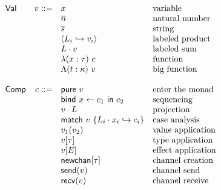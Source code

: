 \documentclass[12pt]{article}
\begin{document}
\[\begin{array}{l r l l}
\\
\textsf{Val}  &      v ::= & x                                 & \text{variable} \\
              &            & \overline{n}                      & \text{natural number} \\
              &            & \overline{s}                      & \text{string} \\
              &            & \langle
                             L_i \hookrightarrow v_i
                             \rangle                           & \text{labeled product} \\
              &            & L \cdot v                         & \text{labeled sum} \\
              &            & \lambda (x : \tau) \ c            & \text{function} \\
              &            & \Lambda (t : \kappa) \ v          & \text{big function} \\
\\
\textsf{Comp} &      c ::= & \textsf{pure} \ v                 & \text{enter the monad} \\
              &            & \textsf{bind} \ x \leftarrow c_1
                             \ \textsf{in} \ c_2               & \text{sequencing} \\
              &            & v \cdot L                         & \text{projection} \\
              &            & \textsf{match} \ v \ \{
                             L_i \cdot x_i \hookrightarrow c_i
                             \}                                & \text{case analysis} \\
              &            & v_1(v_2)                          & \text{value application} \\
              &            & v[\tau]                           & \text{type application} \\
              &            & v[E]                              & \text{effect application} \\
              &            & \textsf{newchan}[\tau]            & \text{channel creation} \\
              &            & \textsf{send}(v)                  & \text{channel send} \\
              &            & \textsf{recv}(v)                  & \text{channel receive} \\
\end{array}
\]
\end{document}
